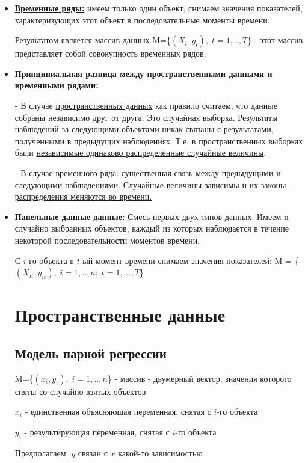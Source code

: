 \documentclass{article}
\begin{document}
\begin{itemize}
\item \textbf{ \underline{Временные ряды:}} имеем только один объект, снимаем значения показателей, характеризующих этот объект в последовательные моменты времени.

Результатом является массив данных M=\{$(X_t, y_t), \;  t=1,..,T$\} - этот массив представляет собой совокупность временных рядов.

\item \textbf{Принципиальная разница между пространственными данными и временными рядами:} 

\item[-]В случае \underline{пространственных данных} 
 как правило считаем, что данные собраны независимо друг от друга. Это случайная выборка. Результаты наблюдений за следующими объектами никак связаны с результатами, полученными в предыдущих наблюдениях. Т.е. в пространственных выборках были \underline{независимые одинаково распределённые случайные величины}. 

\item[-]В случае \underline{временного ряда}: существенная связь между предыдущими и следующими наблюдениями. \underline{Случайные величины зависимы и их законы распределения меняются во времени.}

\item \textbf{ \underline{Панельные данные данные:}} Смесь первых двух типов данных. Имеем n случайно выбранных объектов, каждый из которых наблюдается в течение некоторой последовательности моментов времени.

С $i$-го объекта в $t$-ый момент времени снимаем значения показателей: M = \{$(X_{it}, y_{it}), \;  i=1,..,n ; \; t=1,...,T$\}

\section{Пространственные данные}
\subsection{Модель парной регрессии}
M=\{$(x_i, y_i), \;  i=1,..,n$\} - массив - двумерный вектор, значения которого сняты со случайно взятых объектов

$x_i$ - единственная объясняющая переменная, снятая с $i$-го объекта

$y_i$ - результирующая переменная, снятая с $i$-го объекта

Предполагаем: $y$ связан с $x$ какой-то зависимостью


\end{itemize}
\end{document}
